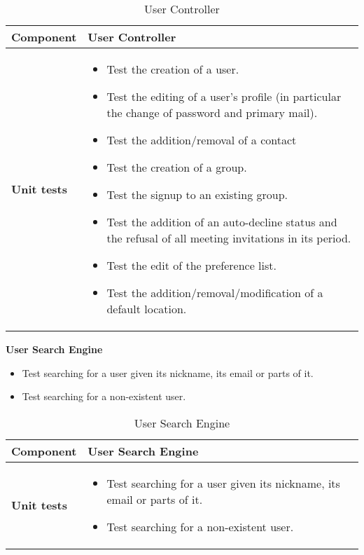 \begin{table}[H]	
	\centering
	\def\arraystretch{1.5}
	\begin{tabular}{|m{4cm}|m{12cm}|}
		\hline
		\textbf{Component} & User Controller \\ \hline
		\textbf{Unit tests} & 
			\begin{itemize}
			\item Test the creation of a user.
			\item Test the editing of a user's profile (in particular the change of password and primary mail).
			\item Test the addition/removal of a contact
			\item Test the creation of a group.
			\item Test the signup to an existing group.
			\item Test the addition of an auto-decline status and the refusal of all meeting invitations in its period.
			\item Test the edit of the preference list.
			\item Test the addition/removal/modification of a default location.
			\end{itemize} \\ \hline
	\end{tabular}
	\caption{User Controller}
\end{table}

\textbf{User Search Engine}

\begin{itemize}
\item Test searching for a user given its nickname, its email or parts of it.
\item Test searching for a non-existent user.
\end{itemize}

\begin{table}[H]	
	\centering
	\def\arraystretch{1.5}
	\begin{tabular}{|m{4cm}|m{12cm}|}
		\hline
		\textbf{Component} & User Search Engine \\ \hline
		\textbf{Unit tests} & 
			\begin{itemize}
			\item Test searching for a user given its nickname, its email or parts of it.
			\item Test searching for a non-existent user.
			\end{itemize} \\ \hline
	\end{tabular}
	\caption{User Search Engine}
\end{table}

